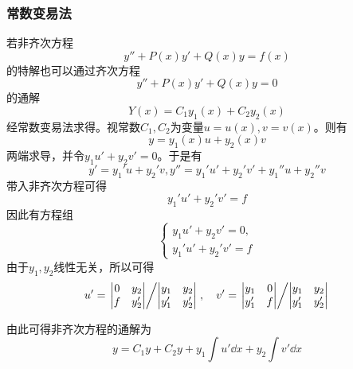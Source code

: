 \subsubsection{常数变易法}
若非齐次方程\[ y'' + P(x)y' + Q(x)y = f(x) \]的特解也可以通过齐次方程
\[ y'' + P(x)y' + Q(x)y = 0 \]
的通解
\[ Y(x) = C_1y_1(x) + C_2y_2(x) \]
经常数变易法求得。视常数$C_1,C_2$为变量$u=u(x),v=v(x)$。则有
\[ y = y_1(x)u + y_2(x)v \]
两端求导，并令$y_1u' + y_2v' = 0$。于是有
\[ y' = y_1'u+y_2'v, y'' = y_1'u' + y_2'v' + y_1''u + y_2''v \]
带入非齐次方程可得
\[ y_1'u'+y_2'v' = f \]
因此有方程组
\[
    \begin{cases}
        y_1u'+y_2v' = 0, \\
        y_1'u'+y_2'v'=f
    \end{cases}
\]
由于$y_1,y_2$线性无关，所以可得
\[
    u' = \left.
    \begin{vmatrix}
        0 & y_2  \\
        f & y_2'
    \end{vmatrix}
    \middle/
    \begin{vmatrix}
        y_1  & y_2  \\
        y_1' & y_2'
    \end{vmatrix}
    \right.
    ,
    \quad
    v' = \left.
    \begin{vmatrix}
        y_1  & 0 \\
        y_1' & f
    \end{vmatrix}
    \middle/
    \begin{vmatrix}
        y_1  & y_2  \\
        y_1' & y_2'
    \end{vmatrix}
    \right.
\]

由此可得非齐次方程的通解为
\[ y = C_1y + C_2y + y_1\int u'\dd{x} + y_2\int v'\dd{x} \]

